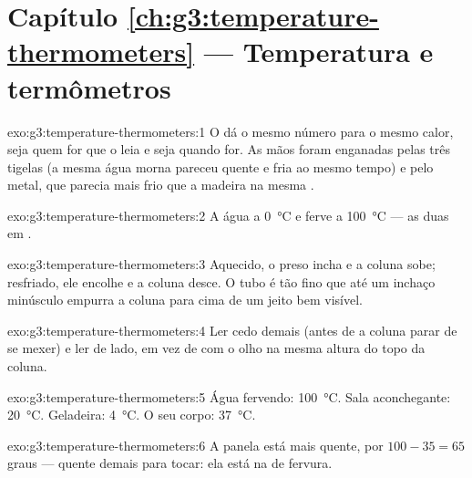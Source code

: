 \section*{Capítulo \ref{ch:g3:temperature-thermometers} --- Temperatura e termômetros}

\begin{solution}{exo:g3:temperature-thermometers:1}
O  dá o mesmo número para o mesmo calor, seja quem for que
o leia e seja quando for. As mãos foram enganadas pelas três tigelas
(a mesma água morna pareceu quente e fria ao mesmo tempo) e pelo
metal, que parecia mais frio que a madeira na mesma .
\end{solution}

\begin{solution}{exo:g3:temperature-thermometers:2}
A água  a \qty{0}{\celsius} e ferve a \qty{100}{\celsius} ---
as duas em .
\end{solution}

\begin{solution}{exo:g3:temperature-thermometers:3}
Aquecido, o  preso incha e a coluna sobe; resfriado, ele
encolhe e a coluna desce. O tubo é tão fino que até um inchaço
minúsculo empurra a coluna para cima de um jeito bem visível.
\end{solution}

\begin{solution}{exo:g3:temperature-thermometers:4}
Ler cedo demais (antes de a coluna parar de se mexer) e ler de lado,
em vez de com o olho na mesma altura do topo da coluna.
\end{solution}

\begin{solution}{exo:g3:temperature-thermometers:5}
Água fervendo: \qty{100}{\celsius}. Sala aconchegante:
\qty{20}{\celsius}. Geladeira: \qty{4}{\celsius}. O seu corpo:
\qty{37}{\celsius}.
\end{solution}

\begin{solution}{exo:g3:temperature-thermometers:6}
A panela está mais quente, por $100 - 35 = 65$ graus --- quente
demais para tocar: ela está na  de fervura.
\end{solution}

